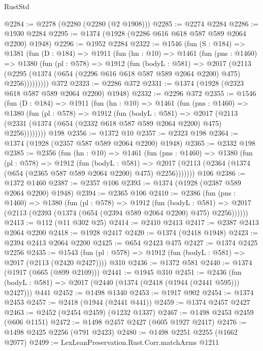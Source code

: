 \begin{lexlean}{RustStd}
\begin{coremodule}
@2284 := @2278 (@2280 (@2280 (@2 @1908)))
@2285 := @2274 @2284
@2286 := @1930 @2284
@2295 := @1374 (@1928 (@2286 @616 @618 @587 @589 @2064 @2200) @1948)
@2296 := @1952 @2284
@2322 := @1546
    (fun (S : @184) =>
    @1381
      (fun (D : @184) =>
      @1911
        (fun (hn : @10) =>
        @1461
          (fun (pns : @1460) =>
          @1380
            (fun (pl : @578) =>
            @1912
              (fun (bodyL : @581) =>
              @2017
                (@2113
                  (@2295 (@1374 (@654 (@2296 @616 @618 @587 @589 @2064 @2200) @475) @2256)))))))))
    @372
@2323 := @2286 @372
@2331 := @1374 (@1928 (@2323 @618 @587 @589 @2064 @2200) @1948)
@2332 := @2296 @372
@2355 := @1546
    (fun (D : @184) =>
    @1911
      (fun (hn : @10) =>
      @1461
        (fun (pns : @1460) =>
        @1380
          (fun (pl : @578) =>
          @1912
            (fun (bodyL : @581) =>
            @2017 (@2113 (@2331 (@1374 (@654 (@2332 @618 @587 @589 @2064 @2200) @475) @2256))))))))
    @198
@2356 := @1372 @10
@2357 := @2323 @198
@2364 := @1374 (@1928 (@2357 @587 @589 @2064 @2200) @1948)
@2365 := @2332 @198
@2385 := @2356
    (fun (hn : @10) =>
    @1461
      (fun (pns : @1460) =>
      @1380
        (fun (pl : @578) =>
        @1912
          (fun (bodyL : @581) =>
          @2017 (@2113 (@2364 (@1374 (@654 (@2365 @587 @589 @2064 @2200) @475) @2256)))))))
    @106
@2386 := @1372 @1460
@2387 := @2357 @106
@2393 := @1374 (@1928 (@2387 @589 @2064 @2200) @1948)
@2394 := @2365 @106
@2410 := @2386
    (fun (pns : @1460) =>
    @1380
      (fun (pl : @578) =>
      @1912
        (fun (bodyL : @581) =>
        @2017 (@2113 (@2393 (@1374 (@654 (@2394 @589 @2064 @2200) @475) @2256))))))
@2413 := @112 (@11 @302 @25)
@2414 := @2410 @2413
@2417 := @2387 @2413 @2064 @2200
@2418 := @1928 @2417
@2420 := @1374 (@2418 @1948)
@2423 := @2394 @2413 @2064 @2200
@2425 := @654 @2423 @475
@2427 := @1374 @2425 @2256
@2435 := @1543 (fun (pl : @578) => @1912 (fun (bodyL : @581) => @2017 (@2113 (@2420 @2427)))) @310
@2436 := @1372 @581
@2440 := @1374 (@1917 (@665 (@899 @2109)))
@2441 := @1945 @310
@2451 := @2436 (fun (bodyL : @581) => @2017 (@2440 (@1374 (@2418 (@1944 (@2441 @595))) @2427))) @441
@2452 := @1498 @1340
@2453 := @1917 @902
@2454 := @1374 @2453
@2457 := @2418 (@1944 (@2441 @441))
@2459 := @1374 @2457 @2427
@2463 := @2452 (@2454 @2459) (@1232 @1337)
@2467 := @1498 @2453 @2459 (@606 @1151)
@2472 := @1498 @2457 @2427 (@605 @1927 @2417)
@2476 := @1498 @2425 @2256 (@791 @2423)
@2480 := @1498 @2251 @2255 (@1662 @2077)
@2499 := LexLeanPreservation.Rust.Corr.matchArms
    @1211

\end{coremodule}
\end{lexlean}
